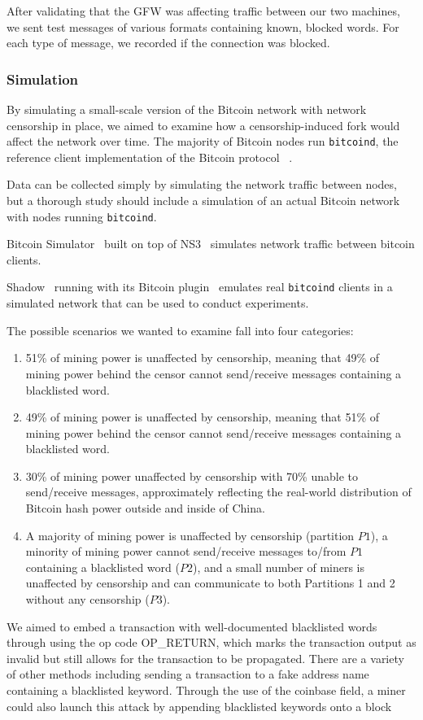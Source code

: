 After validating that the GFW was affecting traffic between our two machines, we sent test messages of various formats containing known, blocked words. For each type of message, we recorded if the connection was blocked.

\subsubsection{Simulation}
By simulating a small-scale version of the Bitcoin network with network censorship in place, we aimed to examine how a censorship-induced fork would affect the network over time. The majority of Bitcoin nodes run \texttt{bitcoind}, the reference client implementation of the Bitcoin protocol ~\cite{shadow-bitcoin}.

Data can be collected simply by simulating the network traffic between nodes, but a thorough study should include a simulation of an actual Bitcoin network with nodes running \texttt{bitcoind}.

Bitcoin Simulator~\cite{bitcoin-simulator} built on top of NS3~\cite{NS3} simulates network traffic between bitcoin clients. %

Shadow~\cite{shadow} running with its Bitcoin plugin~\cite{shadow-bitcoin} emulates real \texttt{bitcoind} clients in a simulated network that can be used to conduct experiments.

The possible scenarios we wanted to examine fall into four categories:
\begin{enumerate}
\item 51\% of mining power is unaffected by censorship, meaning that 49\% of mining power behind the censor cannot send/receive messages containing a blacklisted word.
\item 49\% of mining power is unaffected by censorship, meaning that 51\% of mining power behind the censor cannot send/receive messages containing a blacklisted word.
\item 30\% of mining power unaffected by censorship with 70\% unable to send/receive messages, approximately reflecting the real-world distribution of Bitcoin hash power outside and inside of China.
\item A majority of mining power is unaffected by censorship (partition $P1$), a minority of mining power cannot send/receive messages to/from $P1$ containing a blacklisted word ($P2$), and a small number of miners is unaffected by censorship and can communicate to both Partitions 1 and 2 without any censorship ($P3$).
\end{enumerate}

We aimed to embed a transaction with well-documented blacklisted words through using the op code OP_RETURN, which marks the transaction output as invalid but still allows for the transaction to be propagated. There are a variety of other methods including sending a transaction to a fake address name containing a blacklisted keyword. Through the use of the coinbase field, a miner could also launch this attack by appending blacklisted keywords onto a block 
